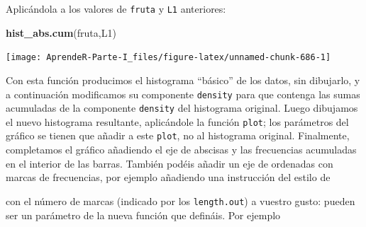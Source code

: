 \documentclass[]{book}
\newenvironment{Shaded}{\begin{snugshade}}{\end{snugshade}}
\newcommand{\DataTypeTok}[1]{\textcolor[rgb]{0.13,0.29,0.53}{#1}}
\newcommand{\DecValTok}[1]{\textcolor[rgb]{0.00,0.00,0.81}{#1}}
\newcommand{\KeywordTok}[1]{\textcolor[rgb]{0.13,0.29,0.53}{\textbf{#1}}}
\newcommand{\NormalTok}[1]{#1}
\newcommand{\OperatorTok}[1]{\textcolor[rgb]{0.81,0.36,0.00}{\textbf{#1}}}
\theoremstyle{definition}
\theoremstyle{definition}
\theoremstyle{definition}
\theoremstyle{remark}
\begin{document}
Aplicándola a los valores de \texttt{fruta} y \texttt{L1} anteriores:

\begin{Shaded}
\begin{Highlighting}[]
\KeywordTok{hist_abs.cum}\NormalTok{(fruta,L1)}
\end{Highlighting}
\end{Shaded}

\begin{center}\texttt{[image: AprendeR-Parte-I\_files/figure-latex/unnamed-chunk-686-1]} \end{center}

Con esta función producimos el histograma ``básico'' de los datos, sin dibujarlo, y a continuación
modificamos su componente \texttt{density} para que contenga las sumas acumuladas de la componente \texttt{density} del histograma original. Luego dibujamos el nuevo histograma resultante, aplicándole la función \texttt{plot}; los parámetros del gráfico se tienen que añadir a este \texttt{plot}, no al histograma original. Finalmente, completamos el gráfico añadiendo el eje de abscisas y las frecuencias acumuladas en el interior de las barras. También podéis añadir un eje de ordenadas con marcas de frecuencias, por ejemplo añadiendo una instrucción del estilo de

\begin{Shaded}
\end{Shaded}

con el número de marcas (indicado por los \texttt{length.out}) a vuestro gusto: pueden ser un parámetro de la nueva función que defináis. Por ejemplo
\end{document}
